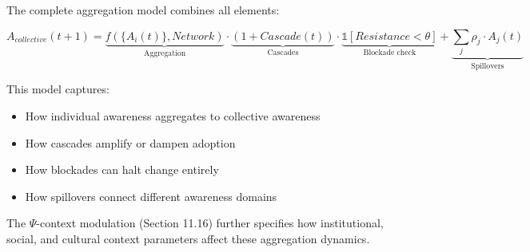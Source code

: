 The complete aggregation model combines all elements:

\begin{equation}
A_{collective}(t+1) = \underbrace{f(\{A_i(t)\}, Network)}_{\text{Aggregation}} 
\cdot \underbrace{(1 + Cascade(t))}_{\text{Cascades}}
\cdot \underbrace{\mathbb{1}[Resistance < \theta]}_{\text{Blockade check}}
+ \underbrace{\sum_j \rho_j \cdot A_j(t)}_{\text{Spillovers}}
\end{equation}

This model captures:
\begin{itemize}
    \item How individual awareness aggregates to collective awareness
    \item How cascades amplify or dampen adoption
    \item How blockades can halt change entirely
    \item How spillovers connect different awareness domains
\end{itemize}

The $\Psi$-context modulation (Section 11.16) further specifies how 
institutional, social, and cultural context parameters affect these 
aggregation dynamics.
